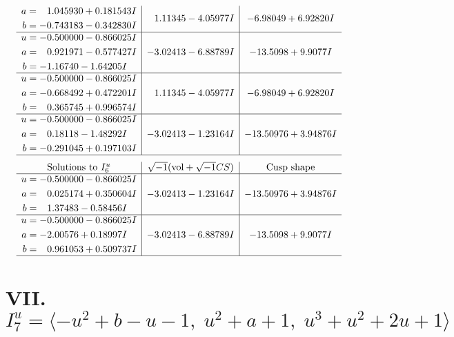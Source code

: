 \documentclass[1p]{elsarticle_modified}
\theoremstyle{definition}
\newcommand{\I}{\sqrt{-1}}
\begin{document}
$$\begin{array}{c|c|c}
\begin{aligned}
a &= \phantom{-}1.045930 + 0.181543 I \\
b &= -0.743183 - 0.342830 I\end{aligned}
 & \phantom{-}1.11345 - 4.05977 I & -6.98049 + 6.92820 I \\ \hline\begin{aligned}
u &= -0.500000 - 0.866025 I \\
a &= \phantom{-}0.921971 - 0.577427 I \\
b &= -1.16740 - 1.64205 I\end{aligned}
 & -3.02413 - 6.88789 I & -13.5098 + 9.9077 I \\ \hline\begin{aligned}
u &= -0.500000 - 0.866025 I \\
a &= -0.668492 + 0.472201 I \\
b &= \phantom{-}0.365745 + 0.996574 I\end{aligned}
 & \phantom{-}1.11345 - 4.05977 I & -6.98049 + 6.92820 I \\ \hline\begin{aligned}
u &= -0.500000 - 0.866025 I \\
a &= \phantom{-}0.18118 - 1.48292 I \\
b &= -0.291045 + 0.197103 I\end{aligned}
 & -3.02413 - 1.23164 I & -13.50976 + 3.94876 I\\
 \hline 
 \end{array}$$\newpage$$\begin{array}{c|c|c}  
\text{Solutions to }I^u_{6}& \I (\text{vol} + \sqrt{-1}CS) & \text{Cusp shape}\\
 \hline 
\begin{aligned}
u &= -0.500000 - 0.866025 I \\
a &= \phantom{-}0.025174 + 0.350604 I \\
b &= \phantom{-}1.37483 - 0.58456 I\end{aligned}
 & -3.02413 - 1.23164 I & -13.50976 + 3.94876 I \\ \hline\begin{aligned}
u &= -0.500000 - 0.866025 I \\
a &= -2.00576 + 0.18997 I \\
b &= \phantom{-}0.961053 + 0.509737 I\end{aligned}
 & -3.02413 - 6.88789 I & -13.5098 + 9.9077 I\\
 \hline 
 \end{array}$$\newpage\newpage\renewcommand{\arraystretch}{1}
\centering \section*{VII. $I^u_{7}= \langle - u^2+b- u-1,\;u^2+a+1,\;u^3+u^2+2 u+1 \rangle$}
\end{document}
